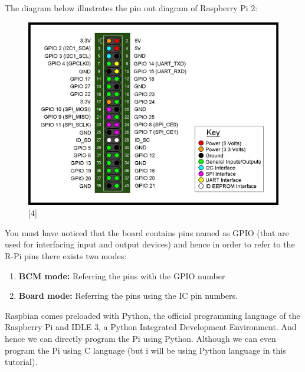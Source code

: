 \documentclass[11pt,a4paper]{article}
\begin{document}
	\newpage
	The diagram below illustrates the pin out diagram of Raspberry Pi 2:
	\begin{figure}[h!]
		\includegraphics[scale=0.6]{RaspberryPi2_pinout.jpg}
		\centering
		\caption{[4]}
	\end{figure} 
	
	\flushleft
	You must have noticed that the board contains pins named as GPIO (that are used for interfacing input and output devices) and hence in order to refer to the R-Pi pins there exists two modes:
	\begin{enumerate}
		\item \textbf{BCM mode:} Referring the pins with the GPIO number
		\item \textbf{Board mode:} Referring the pins using the IC pin numbers.
	\end{enumerate}
	
	\flushleft
	Raspbian comes preloaded with Python, the official programming language of the Raspberry Pi and IDLE 3, a Python Integrated Development Environment. And hence we can directly program the Pi using Python. Although we can even program the Pi using C language (but i will be using Python language in this tutorial).
	
\end{document}
